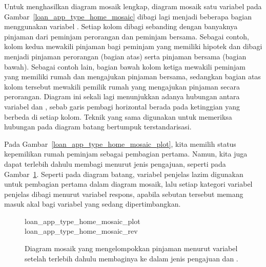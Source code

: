 Untuk menghasilkan diagram mosaik lengkap, diagram mosaik satu variabel
pada Gambar~\ref{loan_app_type_home_mosaic} dibagi lagi menjadi beberapa
bagian menggunakan variabel .
Setiap kolom dibagi sebanding dengan
banyaknya pinjaman dari peminjam perorangan dan peminjam bersama.
Sebagai contoh, kolom kedua mewakili pinjaman
bagi peminjam yang memiliki hipotek
dan dibagi menjadi pinjaman perorangan (bagian atas)
serta pinjaman bersama (bagian bawah).
Sebagai contoh lain, bagian bawah kolom ketiga
mewakili peminjam yang memiliki rumah
dan mengajukan pinjaman bersama, sedangkan bagian atas
kolom tersebut mewakili
pemilik rumah yang mengajukan pinjaman secara perorangan.
Diagram ini sekali lagi menunjukkan adanya hubungan antara
variabel  dan ,
sebab garis pembagi horizontal berada pada ketinggian yang berbeda
di setiap kolom.
Teknik yang sama digunakan untuk memeriksa
hubungan pada diagram batang bertumpuk terstandarisasi.

Pada Gambar~\ref{loan_app_type_home_mosaic_plot},
kita memilih status kepemilikan rumah
peminjam sebagai pembagian pertama.
Namun, kita juga dapat terlebih dahulu membagi menurut
jenis pengajuan, seperti pada
Gambar~\ref{loan_app_type_home_mosaic_rev}.
Seperti pada diagram batang, variabel penjelas lazim digunakan
untuk pembagian pertama dalam diagram mosaik,
lalu setiap kategori variabel penjelas dibagi
menurut variabel respons,
apabila sebutan tersebut memang masuk akal bagi
variabel yang sedang dipertimbangkan.

\begin{figure}[h]
  \centering
      {loan_app_type_home_mosaic_plot}
      {loan_app_type_home_mosaic_rev}
  \caption{Diagram mosaik yang mengelompokkan pinjaman menurut
      variabel  setelah terlebih dahulu
      membaginya ke dalam jenis pengajuan 
      dan .}
  \label{loan_app_type_home_mosaic_rev}
\end{figure}

